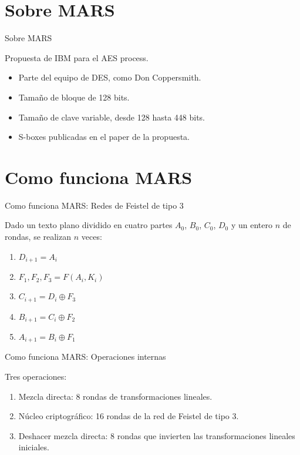 \documentclass{beamer}
\begin{document}
\section{Sobre MARS}
\begin{frame}{Sobre MARS}

	Propuesta de IBM para el AES process.

	\begin{itemize}
		\item Parte del equipo de DES, como Don Coppersmith.
		\item Tamaño de bloque de 128 bits.
		\item Tamaño de clave variable, desde 128 hasta 448 bits.
		\item S-boxes publicadas en el paper de la propuesta.
	\end{itemize}



\end{frame}

\section{Como funciona MARS}
\begin{frame}{Como funciona MARS: Redes de Feistel de tipo 3}

	Dado un texto plano dividido en cuatro partes $A_0$, $B_0$, $C_0$, $D_0$ y un entero $n$ de rondas, se realizan $n$ veces:

	\begin{enumerate}
		\item $D_{i + 1} = A_i$
		\item $F_1, F_2, F_3 = F(A_i, K_i)$
		\item $C_{i + 1} = D_i \oplus F_3$
		\item $B_{i + 1} = C_i \oplus F_2$
		\item $A_{i + 1} = B_i \oplus F_1$
	\end{enumerate}


\end{frame}


\begin{frame}{Como funciona MARS: Operaciones internas}

	Tres operaciones:

	\begin{enumerate}
		\item Mezcla directa: 8 rondas de transformaciones lineales.
		\item Núcleo criptográfico: 16 rondas de la red de Feistel de tipo 3.
		\item Deshacer mezcla directa: 8 rondas que invierten las transformaciones lineales iniciales.
	\end{enumerate}

\end{frame}
\end{document}
